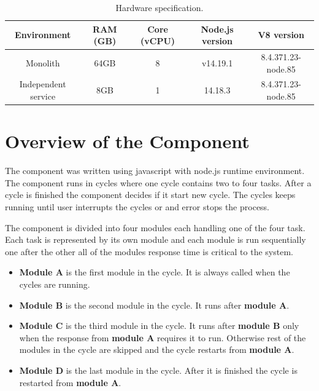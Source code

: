 \begin{table}[h!]
    \begin{tabular}{|c|c|c|c|c|} 
        \hline
        Environment
        & RAM (GB)
        & Core (vCPU)
        & Node.js version
        & V8 version
        \\ 
        \hline\hline
        Monolith
        & 64GB
        & 8
        & v14.19.1
        & 8.4.371.23-node.85
        \\
        Independent service
        & 8GB
        & 1
        & 14.18.3
        & 8.4.371.23-node.85
        \\
        \hline
    \end{tabular}    
    \caption{Hardware specification.}
    \label{represented:harware:specs}
\end{table}

\section{Overview of the Component}
The component was written using javascript with node.js runtime environment.
The component runs in cycles where one cycle contains two to four tasks.
After a cycle is finished the component decides if it start new cycle.
The cycles keeps running until user interrupts the cycles or and error stops the process.

The component is divided into four modules each handling one of the four task.
Each task is represented by its own module and each module is run sequentially one after the other
all of the modules response time is critical to the system.
\begin{itemize}
    \item
    \textbf{Module A} is the first module in the cycle.
    It is always called when the cycles are running.
    
    \item
    \textbf{Module B} is the second module in the cycle.
    It runs after \textbf{module A}.
    
    \item
    \textbf{Module C} is the third module in the cycle.
    It runs after \textbf{module B} only when the response from \textbf{module A} requires it to run.
    Otherwise rest of the modules in the cycle are skipped and the cycle restarts from \textbf{module A}.

    \item
    \textbf{Module D} is the last module in the cycle.
    After it is finished the cycle is restarted from \textbf{module A}.
\end{itemize}

